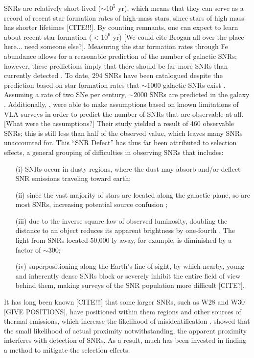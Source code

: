 \documentclass[preprint2,epsf,epsfig,graphics]{emulateapj}
\begin{document}
SNRs are relatively short-lived ($\sim10^5$ yr), which means that they can serve as a record of recent star formation rates of high-mass stars, since stars of high mass has shorter lifetimes {\color{red}[CITE!!!]}.  
By counting remnants, one can expect to learn about recent star formation ($<10^6$ yr) {\color{red}[We could cite Brogan all over the place here... need someone else?]}.  
Measuring the star formation rates through Fe abundance allows for a reasonable prediction of the number of galactic SNRs; however, these predictions imply that there should be far more SNRs than currently detected \citep[e.g.][]{Brogan.06}.  
To date, 294 SNRs have been catalogued \citep{DAGreen.14} despite the prediction based on star formation rates that $\sim1000$ galactic SNRs exist \citep{Li.91}.  
Assuming a rate of two SNe per century, $\sim2000$ SNRs are predicted in the galaxy \citep{Pavlovic.13}.  
Additionally, \citet{Brogan.06}, were able to make assumptions based on known limitations of VLA surveys in order to predict the number of SNRs that are observable at all. {\color{red}[What were the assumptions?]}
Their study yielded a result of 460 observable SNRs; this is still less than half of the observed value, which leaves many SNRs unaccounted for. 
This “SNR Defect” has thus far been attributed to selection effects, a general grouping of difficulties in observing SNRs that includes: 
\begin{itemize}
\item[(i)] SNRs occur in dusty regions, where the dust may absorb and/or deflect SNR emissions traveling toward earth;
\item[(ii)] since the vast majority of stars are located along the galactic plane, so are most SNRs, increasing potential source confusion \citep[e.g.][]{Gao_v.11,Gao_vi.11};
\item[(iii)] due to the inverse square law of observed luminosity, doubling the distance to an object reduces its apparent brightness by one-fourth  \citep{Green.91}. The light from SNRs located 50,000 ly away, for example, is diminished by a factor of $\sim$300;
\item[(iv)] superpositioning along the Earth’s line of sight, by which nearby, young  and inherently dense SNRs block or severely inhibit the entire field of view behind them, making surveys of the SNR population more difficult {\color{red}[CITE?]}. 
\end{itemize}

It has long been known {\color{red}[CITE!!!]} that some larger SNRs, such as W28 and W30 {\color{red}[GIVE POSITIONS]}, have positioned within them  regions and other sources of thermal emissions, which increase the likelihood of misidentification \citep{Andrews.85}.  \cite{Brogan.06} showed that the small likelihood of actual proximity notwithstanding, the apparent proximity interferes with detection of SNRs.  As a result, much has been invested in finding a method to mitigate the selection effects. 
\end{document}
